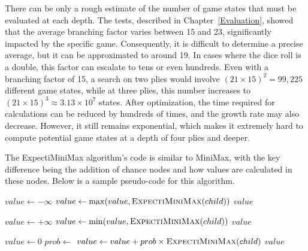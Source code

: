 There can be only a rough estimate of the number of game states that must be evaluated at each depth. The tests, described in Chapter~\ref{Evaluation}, showed that the average branching factor varies between 15 and 23, significantly impacted by the specific game. Consequently, it is difficult to determine a precise average, but it can be approximated to around 19. In cases where the dice roll is a double, this factor can escalate to tens or even hundreds. Even with a branching factor of 15, a search on two plies would involve $(21\times15)^2 = 99,\!225$ different game states, while at three plies, this number increases to $(21\times15)^3 \approx 3.13 \times 10^7$ states. After optimization, the time required for calculations can be reduced by hundreds of times, and the growth rate may also decrease. However, it still remains exponential, which makes it extremely hard to compute potential game states at a depth of four plies and deeper.

The ExpectiMiniMax algorithm's code is similar to MiniMax, with the key difference being the addition of chance nodes and how values are calculated in these nodes. Below is a sample pseudo-code for this algorithm.

\begin{algorithm}[H]
\caption{ExpectiMiniMax Algorithm}
\label{alg:expectiminimax}
\begin{algorithmic}[1]
        \State \Return {}
    \EndIf

        \State $value \gets -\infty$
            \State $value \gets \max(value, \Call{ExpectiMiniMax}{child})$
        \EndFor
        \State \Return $value$

        \State $value \gets +\infty$
            \State $value \gets \min(value, \Call{ExpectiMiniMax}{child})$
        \EndFor
        \State \Return $value$

        \State $value \gets 0$
            \State $prob \gets$ 
            \State $value \gets value + prob \times \Call{ExpectiMiniMax}{child}$
        \EndFor
        \State \Return $value$
    \EndIf
\EndFunction
\end{algorithmic}
\end{algorithm}

